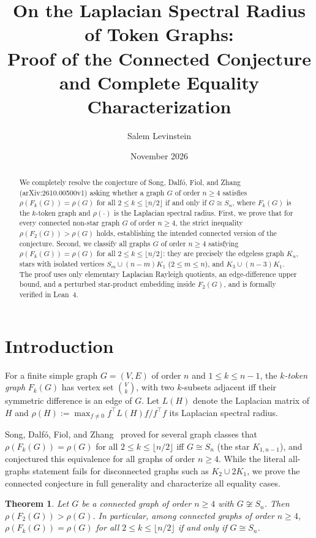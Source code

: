 \documentclass[11pt]{article}
\title{On the Laplacian Spectral Radius of Token Graphs:\\ Proof of the Connected Conjecture and Complete Equality Characterization}
\author{Salem Levinstein}
\date{November 2026}
\newtheorem{theorem}{Theorem}
\begin{document}
\maketitle

\begin{abstract}
We completely resolve the conjecture of Song, Dalf\'o, Fiol, and Zhang
(arXiv:2610.00500v1) asking whether a graph $G$ of order $n \ge 4$ satisfies
$\rho(F_k(G)) = \rho(G)$ for all $2 \le k \le \lfloor n/2 \rfloor$ if and only
if $G \cong S_n$, where $F_k(G)$ is the $k$-token graph and $\rho(\cdot)$ is
the Laplacian spectral radius. First, we prove that for every connected
non-star graph $G$ of order $n \ge 4$, the strict inequality
$\rho(F_2(G)) > \rho(G)$ holds, establishing the intended connected version of
the conjecture. Second, we classify all graphs $G$ of order $n \ge 4$
satisfying $\rho(F_k(G)) = \rho(G)$ for all $2 \le k \le \lfloor n/2 \rfloor$:
they are precisely the edgeless graph $\overline{K_n}$, stars with isolated
vertices $S_m \cup (n - m)K_1$ ($2 \le m \le n$), and $K_3 \cup (n - 3)K_1$.
The proof uses only elementary Laplacian Rayleigh quotients, an edge-difference
upper bound, and a perturbed star-product embedding inside $F_2(G)$, and is
formally verified in Lean~4.
\end{abstract}

\section{Introduction}

For a finite simple graph $G = (V, E)$ of order $n$ and $1 \le k \le n - 1$,
the \emph{$k$-token graph} $F_k(G)$ has vertex set $\binom{V}{k}$, with two
$k$-subsets adjacent iff their symmetric difference is an edge of $G$. Let
$L(H)$ denote the Laplacian matrix of $H$ and
$\rho(H) := \max_{f \neq 0} f^\top L(H) f / f^\top f$ its Laplacian spectral
radius.

Song, Dalf\'o, Fiol, and Zhang~\cite{SDFZ2026} proved for several graph classes
that $\rho(F_k(G)) = \rho(G)$ for all $2 \le k \le \lfloor n/2 \rfloor$ iff
$G \cong S_n$ (the star $K_{1, n-1}$), and conjectured this equivalence for all
graphs of order $n \ge 4$. While the literal all-graphs statement fails for
disconnected graphs such as $K_2 \cup 2K_1$, we prove the connected conjecture
in full generality and characterize all equality cases.

\begin{theorem}\label{thm:conn}
Let $G$ be a connected graph of order $n \ge 4$ with $G \not\cong S_n$. Then
$\rho(F_2(G)) > \rho(G)$. In particular, among connected graphs of order
$n \ge 4$, $\rho(F_k(G)) = \rho(G)$ for all $2 \le k \le \lfloor n/2 \rfloor$
if and only if $G \cong S_n$.
\end{theorem}
\end{document}
